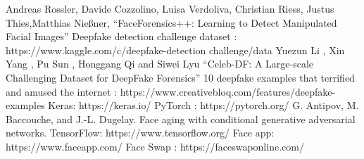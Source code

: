 
\begin{thebibliography}{99}
    Andreas Rossler, Davide Cozzolino, Luisa Verdoliva, Christian Riess, Justus
    Thies,Matthias Nießner, “FaceForensics++: Learning to Detect Manipulated Facial
    Images”
    Deepfake detection challenge dataset : https://www.kaggle.com/c/deepfake-detection challenge/data
     Yuezun Li , Xin Yang , Pu Sun , Honggang Qi and Siwei Lyu “Celeb-DF: A
    Large-scale Challenging Dataset for DeepFake Forensics”
    10 deepfake examples that terrified and amused the internet :
    https://www.creativebloq.com/features/deepfake-examples
    Keras: https://keras.io/
    PyTorch : https://pytorch.org/
    G. Antipov, M. Baccouche, and J.-L. Dugelay. Face aging with conditional generative adversarial networks.
     TensorFlow: https://www.tensorflow.org/
    Face app: https://www.faceapp.com/
    Face Swap : https://faceswaponline.com/

\end{thebibliography}
